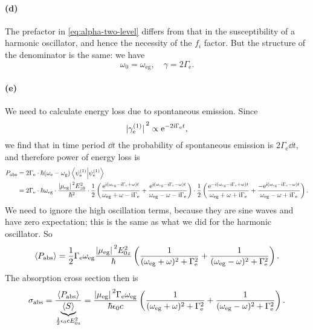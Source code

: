 \documentclass[hyperref, a4paper]{article}
\newcommand*{\ii}{\mathrm{i}}
\newcommand*{\ee}{\mathrm{e}}
\newcommand*{\Gammae}{\Gamma_{\text{e}}}
\newcommand*{\omegae}{\omega_{\text{e}}}
\newcommand*{\omegag}{\omega_{\text{g}}}
\newcommand*{\omegaeg}{\omega_{\text{eg}}}
\newcommand*{\ptwfc}[2]{\psi^{(#2)}_{#1}}
\newcommand*{\mueg}{\mu_{\text{eg}}}
\begin{document}
\paragraph{(d)} The prefactor in \eqref{eq:alpha-two-level} differs from that 
in the susceptibility of a harmonic oscillator, 
and hence the necessity of the $f_i$ factor.
But the structure of the denominator is the same:
we have 
\begin{equation}
    \omega_0 = \omegaeg , \quad 
    \gamma = 2 \Gammae.
\end{equation}

\paragraph{(e)} We need to calculate energy loss due to spontaneous emission.
Since 
\begin{equation}
    \abs*{\gamma_{\text{e}}^{(1)}}^2 \propto \ee^{- 2 \ii \Gammae t},
\end{equation}
we find that in time period $\dd{t}$ the probability of spontaneous emission is $2 \Gammae \dd{t}$,
and therefore power of energy loss is 
\begin{equation}
    \begin{aligned}
        P_{\text{abs}} &=  2 \Gammae \cdot \hbar (\omegae - \omegag) 
        \braket{\ptwfc{\text{e}}{1}}{\ptwfc{\text{e}}{1}}  \\
        &= 2 \Gammae \cdot \hbar \omegaeg \cdot 
        \frac{\abs*{\mu_{\text{eg}}}^2 E_{z0}^2}{\hbar^2} 
        \cdot \frac{1}{2} \left(
            \frac{\ee^{\ii (\omegaeg - \ii \Gammae + \omega) t}}{
                \omegaeg + \omega - \ii \Gammae
            } + 
            \frac{\ee^{\ii (\omegaeg - \ii \Gammae - \omega) t}}{
                \omegaeg - \omega - \ii \Gammae
            }
        \right) \cdot 
        \frac{1}{2} \left(
            \frac{\ee^{- \ii (\omegaeg - \ii \Gammae + \omega) t}}{
                \omegaeg + \omega + \ii \Gammae
            } + 
            \frac{- \ee^{\ii (\omegaeg - \ii \Gammae - \omega) t}}{
                \omegaeg - \omega + \ii \Gammae
            }
        \right).
    \end{aligned}
\end{equation}
We need to ignore the high oscillation terms, 
because they are sine waves and have zero expectation;
this is the same as what we did for the harmonic oscillator.
So 
\begin{equation}
    \expval{P_{\text{abs}}} = \frac{1}{2} \Gammae \omegaeg \frac{\abs*{\mueg}^2 E_{0z}^2}{\hbar}
    \left(
        \frac{1}{(\omegaeg + \omega)^2 + \Gammae^2} + 
        \frac{1}{(\omegaeg - \omega)^2 + \Gammae^2}
    \right).
\end{equation}
The absorption cross section then is 
\begin{equation}
    \sigma_{\text{abs}} = \frac{\expval{P_{\text{abs}}}}{
        \underbrace{\expval{S}}_{
            \frac{1}{2} \epsilon_0 c E_{0z}^2
        }
    }
    =  \frac{\abs*{\mueg}^2 \Gammae \omegaeg}{\hbar \epsilon_0 c}
    \left(
        \frac{1}{(\omegaeg + \omega)^2 + \Gammae^2} + 
        \frac{1}{(\omegaeg - \omega)^2 + \Gammae^2}
    \right).
\end{equation}
\end{document}
